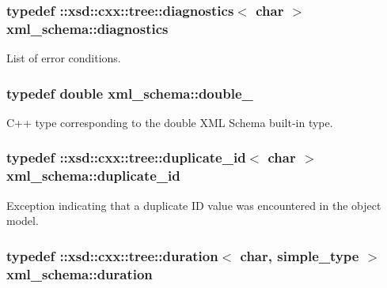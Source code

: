 \hypertarget{namespacexml__schema_a62cc106990ec99fdaf2f3364d98cfabd}{}
\subsubsection[{diagnostics}]{\setlength{\rightskip}{0pt plus 5cm}typedef \+::xsd\+::cxx\+::tree\+::diagnostics$<$ char $>$ {\bf xml\+\_\+schema\+::diagnostics}}\label{namespacexml__schema_a62cc106990ec99fdaf2f3364d98cfabd}


List of error conditions. 

\hypertarget{namespacexml__schema_aac2d3d3483d3a20e8d96d2e8e5b3a470}{}
\subsubsection[{double\+\_\+}]{\setlength{\rightskip}{0pt plus 5cm}typedef double {\bf xml\+\_\+schema\+::double\+\_\+}}\label{namespacexml__schema_aac2d3d3483d3a20e8d96d2e8e5b3a470}


C++ type corresponding to the double X\+M\+L Schema built-\/in type. 

\hypertarget{namespacexml__schema_a22a2b3c973b87b06c2868d85a154fd63}{}
\subsubsection[{duplicate\+\_\+id}]{\setlength{\rightskip}{0pt plus 5cm}typedef \+::xsd\+::cxx\+::tree\+::duplicate\+\_\+id$<$ char $>$ {\bf xml\+\_\+schema\+::duplicate\+\_\+id}}\label{namespacexml__schema_a22a2b3c973b87b06c2868d85a154fd63}


Exception indicating that a duplicate I\+D value was encountered in the object model. 

\hypertarget{namespacexml__schema_acd79b4620c053b211a2e739daed3b2bf}{}
\subsubsection[{duration}]{\setlength{\rightskip}{0pt plus 5cm}typedef \+::xsd\+::cxx\+::tree\+::duration$<$ char, {\bf simple\+\_\+type} $>$ {\bf xml\+\_\+schema\+::duration}}\label{namespacexml__schema_acd79b4620c053b211a2e739daed3b2bf}


